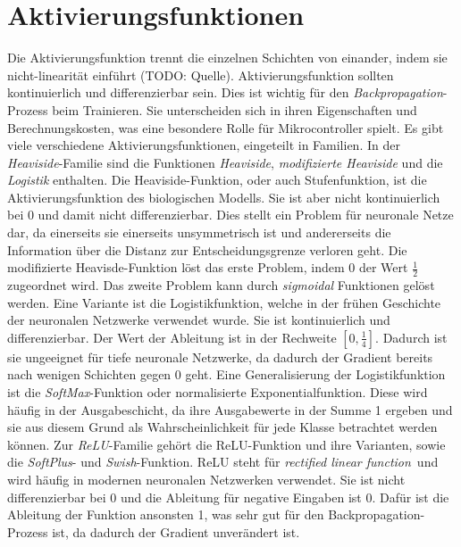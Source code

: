 \section{Aktivierungsfunktionen}
Die Aktivierungsfunktion trennt die einzelnen Schichten von einander, indem sie nicht-linearität einführt (TODO: Quelle).
Aktivierungsfunktion sollten kontinuierlich und differenzierbar sein.
Dies ist wichtig für den \textit{Backpropagation}-Prozess beim Trainieren.
Sie unterscheiden sich in ihren Eigenschaften und Berechnungskosten, was eine besondere Rolle für Mikrocontroller spielt.
Es gibt viele verschiedene Aktivierungsfunktionen, eingeteilt in Familien.
\newline
\newline
In der \textit{Heaviside}-Familie sind die Funktionen \textit{Heaviside}, \textit{modifizierte Heaviside} und die \textit{Logistik} enthalten.
Die Heaviside-Funktion, oder auch Stufenfunktion, ist die Aktivierungsfunktion des biologischen Modells.
Sie ist aber nicht kontinuierlich bei 0 und damit nicht differenzierbar.
Dies stellt ein Problem für neuronale Netze dar, da einerseits sie einerseits unsymmetrisch ist und andererseits die Information über die Distanz zur Entscheidungsgrenze verloren geht.
Die modifizierte Heavisde-Funktion löst das erste Problem, indem 0 der Wert $\frac{1}{2}$ zugeordnet wird.
Das zweite Problem kann durch \textit{sigmoidal} Funktionen gelöst werden.
Eine Variante ist die Logistikfunktion, welche in der frühen Geschichte der neuronalen Netzwerke verwendet wurde.
Sie ist kontinuierlich und differenzierbar. Der Wert der Ableitung ist in der Rechweite $[0, \frac{1}{4}]$.
Dadurch ist sie ungeeignet für tiefe neuronale Netzwerke, da dadurch der Gradient bereits nach wenigen Schichten gegen 0 geht.
Eine Generalisierung der Logistikfunktion ist die \textit{SoftMax}-Funktion oder normalisierte Exponentialfunktion.
Diese wird häufig in der Ausgabeschicht, da ihre Ausgabewerte in der Summe 1 ergeben und sie aus diesem Grund als Wahrscheinlichkeit für jede Klasse betrachtet werden können.
\newline
\newline
Zur \textit{ReLU}-Familie gehört die ReLU-Funktion und ihre Varianten, sowie die \textit{SoftPlus}- und \textit{Swish}-Funktion.
ReLU steht für \glqq\textit{rectified linear function}\grqq\ und wird häufig in modernen neuronalen Netzwerken verwendet.
Sie ist nicht differenzierbar bei 0 und die Ableitung für negative Eingaben ist 0.
Dafür ist die Ableitung der Funktion ansonsten 1, was sehr gut für den Backpropagation-Prozess ist, da dadurch der Gradient unverändert ist.
